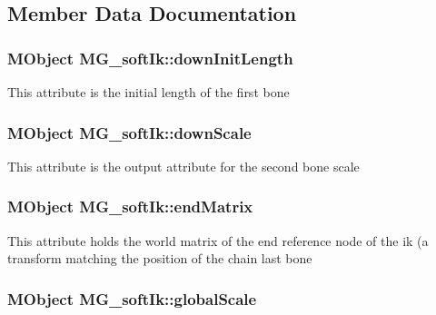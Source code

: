 \subsection{Member Data Documentation}
\hypertarget{class_m_g__soft_ik_afb62d1fde24129ba913b96afc8ec4ecc}{
\subsubsection[{down\-Init\-Length}]{\setlength{\rightskip}{0pt plus 5cm}M\-Object M\-G\-\_\-soft\-Ik\-::down\-Init\-Length\hspace{0.3cm}{\ttfamily [static]}}}\label{class_m_g__soft_ik_afb62d1fde24129ba913b96afc8ec4ecc}
This attribute is the initial length of the first bone \hypertarget{class_m_g__soft_ik_a52416d57abfb94a331943f1fa58fd53e}{
\subsubsection[{down\-Scale}]{\setlength{\rightskip}{0pt plus 5cm}M\-Object M\-G\-\_\-soft\-Ik\-::down\-Scale\hspace{0.3cm}{\ttfamily [static]}}}\label{class_m_g__soft_ik_a52416d57abfb94a331943f1fa58fd53e}
This attribute is the output attribute for the second bone scale \hypertarget{class_m_g__soft_ik_ac909738ce18e4fb5997f468c0a33cdfb}{
\subsubsection[{end\-Matrix}]{\setlength{\rightskip}{0pt plus 5cm}M\-Object M\-G\-\_\-soft\-Ik\-::end\-Matrix\hspace{0.3cm}{\ttfamily [static]}}}\label{class_m_g__soft_ik_ac909738ce18e4fb5997f468c0a33cdfb}
This attribute holds the world matrix of the end reference node of the ik (a transform matching the position of the chain last bone \hypertarget{class_m_g__soft_ik_a984339b87697837dd64877689846753d}{
\subsubsection[{global\-Scale}]{\setlength{\rightskip}{0pt plus 5cm}M\-Object M\-G\-\_\-soft\-Ik\-::global\-Scale\hspace{0.3cm}{\ttfamily [static]}}}\label{class_m_g__soft_ik_a984339b87697837dd64877689846753d}
